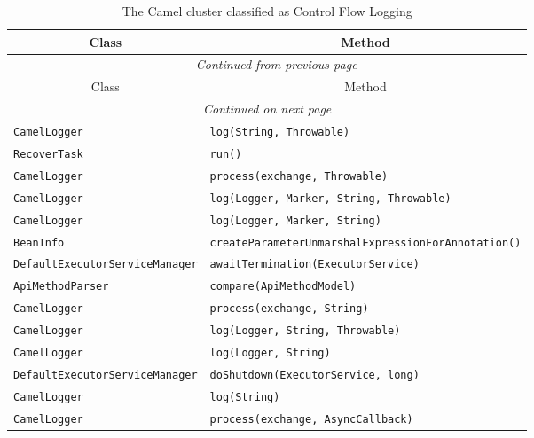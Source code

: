 \begin{center}
\begin{longtable}{ll}
\caption{The Camel cluster classified as Control Flow Logging}\\
\toprule\multicolumn{1}{c}{Class}&\multicolumn{1}{c}{Method}\\\midrule
\endfirsthead

\multicolumn{2}{c}{\tablename\ \thetable{}---\textit{Continued from previous page}} \\\midrule
\multicolumn{1}{c}{Class}&\multicolumn{1}{c}{Method}\\\midrule
\endhead
\multicolumn{2}{c}{\textit{Continued on next page}}\\\midrule
\endfoot
\bottomrule
\endlastfoot

\lstinline/CamelLogger/&{\lstinline/log(String, Throwable)/}\\
\lstinline/RecoverTask/&{\lstinline/run()/}\\
\lstinline/CamelLogger/&{\lstinline/process(exchange, Throwable)/}\\
\lstinline/CamelLogger/&{\lstinline/log(Logger, Marker, String, Throwable)/}\\
\lstinline/CamelLogger/&{\lstinline/log(Logger, Marker, String)/}\\
\lstinline/BeanInfo/&{\lstinline/createParameterUnmarshalExpressionForAnnotation()/}\\
\lstinline/DefaultExecutorServiceManager/&{\lstinline/awaitTermination(ExecutorService)/}\\
\lstinline/ApiMethodParser/&{\lstinline/compare(ApiMethodModel)/}\\
\lstinline/CamelLogger/&{\lstinline/process(exchange, String)/}\\
\lstinline/CamelLogger/&{\lstinline/log(Logger, String, Throwable)/}\\
\lstinline/CamelLogger/&{\lstinline/log(Logger, String)/}\\
\lstinline/DefaultExecutorServiceManager/&{\lstinline/doShutdown(ExecutorService, long)/}\\
\lstinline/CamelLogger/&{\lstinline/log(String)/}\\
\lstinline/CamelLogger/&{\lstinline/process(exchange, AsyncCallback)/}\\
\end{longtable}
\end{center}

